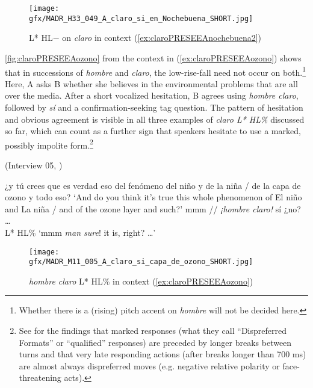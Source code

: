 \begin{figure}
	\texttt{[image: gfx/MADR\_H33\_049\_A\_claro\_si\_en\_Nochebuena\_SHORT.jpg]}
	\caption[L* HL$-$ on \textit{claro} in context (\ref{ex:claroPRESEEAnochebuena2})]{L* HL$-$ on \textit{claro} in context (\ref{ex:claroPRESEEAnochebuena2}) \href{https://osf.io/8f4sn/}{\faVolumeUp} \label{fig:claroPRESEEAnochebuena}}
\end{figure}

\autoref{fig:claroPRESEEAozono} from the context in (\ref{ex:claroPRESEEAozono}) shows that in successions of \textit{hombre} and \textit{claro}, the low-rise-fall need not occur on both.\footnote{Whether there is a (rising) pitch accent on \textit{hombre} will not be decided here.} Here, A asks B whether she believes in the environmental problems that are all over the media. After a short vocalized hesitation, B agrees using \textit{hombre claro}, followed by \textit{sí} and a confirmation-seeking tag question. The pattern of hesitation and obvious agreement is visible in all three examples of \textit{claro L* HL\%} discussed so far, which can count as a further sign that speakers hesitate to use a marked, possibly impolite form.\footnote{See \citet{KendrickTorreira.2015} for the findings that marked responses (what they call ``Dispreferred Formats'' or ``qualified'' responses) are preceded by longer breaks between turns and that very late responding actions (after breaks longer than 700 ms) are almost always dispreferred moves (e.g. negative relative polarity or face-threatening acts).}\largerpage

\begin{exe}
	\ex \label{ex:claroPRESEEAozono}(Interview 05, \cite{PRESEEA.20142020})
	\begin{xlist}[A:]
	 ¿y tú crees que es verdad eso del fenómeno del niño y de la niña / de la capa de ozono y todo eso?
	\glt `And do you think it's true this whole phenomenon of El niño and La niña / and of the ozone layer and such?'
	 mmm // \textit{¡hombre claro!} sí ¿no? \ldots \\
	\hspace*{7.5em}L* HL\%
	\glt `mmm \textit{man sure}! it is, right? \ldots'
	\end{xlist}
\end{exe}

\begin{figure}
	\texttt{[image: gfx/MADR\_M11\_005\_A\_claro\_si\_capa\_de\_ozono\_SHORT.jpg]}
	\caption{\textit{hombre claro} L* HL\% in context (\ref{ex:claroPRESEEAozono}) \href{https://osf.io/56v78/}{\faVolumeUp} \label{fig:claroPRESEEAozono}}
\end{figure}

